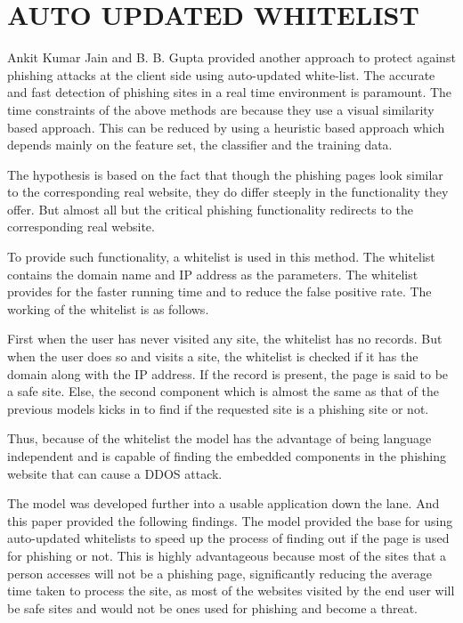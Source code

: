 \section{AUTO UPDATED WHITELIST}
Ankit Kumar Jain and B. B. Gupta provided another approach \cite{jain} to protect against phishing attacks at the client side using auto-updated white-list. The accurate and fast detection of phishing sites in a real time environment is paramount. The time constraints of the above methods are because they use a visual similarity based approach. This can be reduced by using a heuristic based  approach which depends mainly on the feature set, the classifier and the training data. 

The hypothesis is based on the fact that though the phishing pages look similar to the corresponding real website, they do differ steeply in the functionality they offer. But almost all but the critical phishing functionality redirects to the corresponding real website.

To provide such functionality, a whitelist is used in this method. The whitelist contains the domain name and IP address as the parameters. The whitelist provides for the faster running time and to reduce the false positive rate. The working of the whitelist is as follows.

First when the user has never visited any site, the whitelist has no records. But when the user does so and visits a site, the whitelist is checked if it has the domain along with the IP address. If the record is present, the page is said to be a safe site. Else, the second component which is almost the same as that of the previous models kicks in to find if the requested site is a phishing site or not.

Thus, because of the whitelist the model has the advantage of being language independent and is capable of finding the embedded components in the phishing website that can cause a DDOS attack.

The model was developed further into a usable application down the lane. And this paper provided the following findings. The model provided the base for using auto-updated whitelists to speed up the process of finding out if the page is used for phishing or not. This is highly advantageous because most of the sites that a person accesses will not be a phishing page, significantly reducing the average time taken to process the site, as most of the websites visited by the end user will be safe sites and would not be ones used for phishing and become a threat. 

